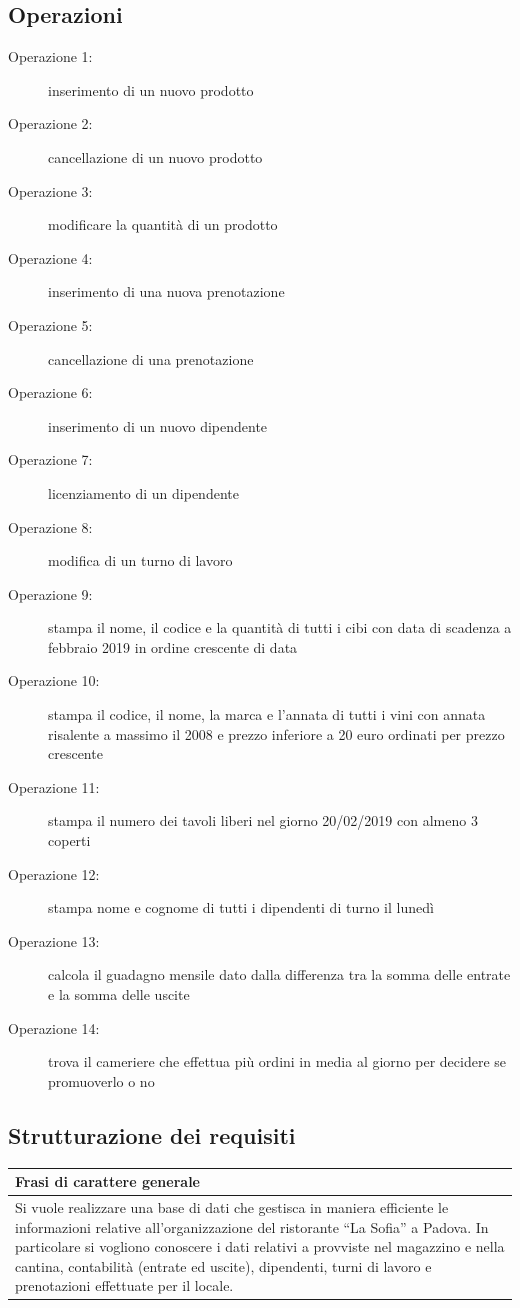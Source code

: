 \subsection{Operazioni} %
\begin{description}
    \item [Operazione 1:] inserimento di un nuovo prodotto
    \item [Operazione 2:] cancellazione di un nuovo prodotto
    \item [Operazione 3:] modificare la quantità di un prodotto
    \item [Operazione 4:] inserimento di una nuova prenotazione
    \item [Operazione 5:] cancellazione di una prenotazione
    \item [Operazione 6:] inserimento di un nuovo dipendente
    \item [Operazione 7:] licenziamento di un dipendente
    \item [Operazione 8:] modifica di un turno di lavoro 
    \item [Operazione 9:] stampa il nome, il codice e la quantità di tutti i cibi con data di scadenza a febbraio 2019 in ordine crescente di data
    \item [Operazione 10:] stampa il codice, il nome, la marca e l’annata di tutti i vini con annata risalente a massimo il 2008 e prezzo inferiore a 20 euro ordinati per prezzo crescente
    \item [Operazione 11:] stampa il numero dei tavoli liberi nel giorno 20/02/2019 con almeno 3 coperti 
    \item [Operazione 12:] stampa nome e cognome di tutti i dipendenti di turno il lunedì
    \item [Operazione 13:] calcola il guadagno mensile dato dalla differenza tra la somma delle entrate e la somma delle uscite
    \item [Operazione 14:] trova il cameriere che effettua più ordini in media al giorno per decidere se promuoverlo o no
\end{description}

\subsection{Strutturazione dei requisiti} 
\begin{longtable}{|p{15.5cm}|}
    \hline
    \textbf{Frasi di carattere generale} \\ \hline
    Si vuole realizzare una base di dati che gestisca in maniera efficiente le informazioni relative all’organizzazione del ristorante “La Sofia” a Padova. In particolare si vogliono conoscere i dati relativi a provviste nel magazzino e nella cantina, contabilità (entrate ed uscite), dipendenti, turni di lavoro e prenotazioni effettuate per il locale. \\ \hline
\end{longtable}

